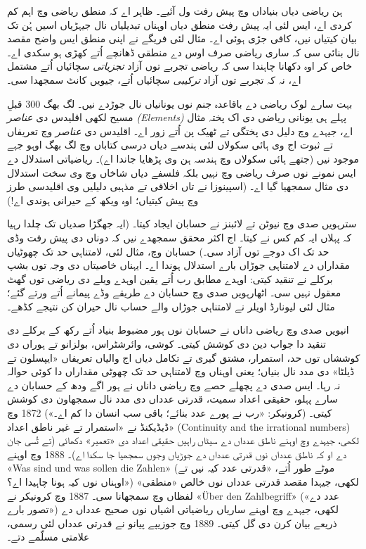 \documentclass[../../../include/open-logic-section]{subfiles}
\begin{document}
ہن ریاضی دیاں بنیاداں وچ پیش رفت ول آئیے۔
ظاہر اے کہ منطق ریاضی وچ اہم کم کردی اے، ایس لئی
ایہ پیش رفت منطق دیاں اوہناں تبدیلیاں نال
جیہڑیاں اسیں ہُن تک بیان کیتیاں نیں،
کافی جڑی ہوئی اے۔ مثال لئی فریگے نے اپنی
منطق ایس واضح مقصد نال بنائی سی کہ ساری
ریاضی صرف اوس دے منطقی ڈھانچے اُتے کھڑی
ہو سکدی اے۔ خاص کر اوہ دکھانا چاہندا سی
کہ ریاضی تجربے توں آزاد \emph{تجزیاتی}
سچائیاں اُتے مشتمل اے، نہ کہ تجربے توں
آزاد \emph{ترکیبی} سچائیاں اُتے، جیویں
کانٹ سمجھدا سی۔

بہت سارے لوک ریاضی دے باقاعدہ جنم نوں یونانیاں نال
جوڑدے نیں۔ لگ بھگ 300 قبلِ مسیح لکھی اقلیدس دی
\emph{عناصر (Elements)} پہلے ہی یونانی ریاضی دی
اک پختہ مثال اے، جیہدے وچ دلیل دی پختگی تے ٹھیک پن اُتے
زور اے۔ اقلیدس دی \emph{عناصر} وچ تعریفاں تے
ثبوت اج وی ہائی سکولاں لئی ہندسے دیاں درسی کتاباں وچ لگ بھگ
اوہو جہے موجود نیں (جتھے ہائی سکولاں وچ ہندسہ ہن وی
پڑھایا جاندا اے)۔ ریاضیاتی استدلال دے ایس نمونے
نوں صرف ریاضی وچ نہیں بلکہ فلسفے دیاں شاخاں وچ وی
سخت استدلال دی مثال سمجھیا گیا اے۔ (اسپینوزا نے
تاں اخلاقی تے مذہبی دلیلیں وی اقلیدسی طرز وچ پیش
کیتیاں؛ اوہ ویکھ کے حیرانی ہوندی اے!)

سترہویں صدی وچ نیوٹن تے لائبنز نے حسابان ایجاد کیتا۔
(ایہ جھگڑا صدیاں تک چلدا رہیا کہ پہلاں ایہ کم کس نے کیتا۔ اج
اکثر محقق سمجھدے نیں کہ دوناں دی پیش رفت وڈی حد
تک اک دوجے توں آزاد سی۔) حسابان وچ، مثال لئی،
لامتناہی حد تک چھوٹیاں مقداراں دے لامتناہی جوڑاں بارے
استدلال ہوندا اے۔ ایہناں خاصیتاں دی وجہ توں
بشپ برکلے نے تنقید کیتی: اوہدے مطابق رب اُتے
یقین اوہدے ویلے دی ریاضی توں گھٹ معقول نہیں سی۔
اٹھارہویں صدی وچ حسابان دے طریقے وڈے پیمانے
اُتے ورتے گئے؛ مثال لئی لیونارڈ اویلر نے
لامتناہی جوڑاں والے حساب نال حیران کن
نتیجے کڈھے۔

انیویں صدی وچ ریاضی داناں نے حسابان نوں ہور مضبوط
بنیاد اُتے رکھ کے برکلے دی تنقید دا جواب دین دی
کوشش کیتی۔ کوشی، وائرشٹراس، بولزانو تے ہوراں دی
کوششاں توں حد، استمرار، مشتق گیری تے تکامل دیاں
اج والیاں تعریفاں «ایپسلون تے ڈیلٹا» دی مدد نال
بنیاں؛ یعنی اوہناں وچ لامتناہی حد تک چھوٹی
مقداراں دا کوئی حوالہ نہ رہا۔ ایس صدی دے پچھلے
حصے وچ ریاضی داناں نے ہور اگے ودھ کے حسابان
دے سارے پہلو، حقیقی اعداد سمیت، قدرتی عدداں
دی مدد نال سمجھاون دی کوشش کیتی۔ (کرونیکر:
«رب نے پورے عدد بنائے؛ باقی سب انسان دا کم اے۔»)
1872 وچ ڈیڈیکنڈ نے «استمرار تے غیر ناطق اعداد»
(Continuity and the irrational numbers) لکھی،
جیہدے وچ اوہنے ناطق عدداں دے سیٹاں راہیں
حقیقی اعداد دی «تعمیر» دکھائی (تے تُسی جان دے
او کہ ناطق عدداں نوں قدرتی عدداں دے جوڑیاں
وجوں سمجھیا جا سکدا اے)۔ 1888 وچ اوہنے
«Was sind und was sollen die Zahlen» (موٹے
طور اُتے، «قدرتی عدد کیہ نیں تے اوہناں نوں
کیہ ہونا چاہیدا اے؟») لکھی، جیہدا مقصد
قدرتی عدداں نوں خالص «منطقی» لفظاں وچ
سمجھانا سی۔ 1887 وچ کرونیکر نے
«\"Uber den Zahlbegriff» («عدد دے تصور بارے»)
لکھی، جیہدے وچ اوہنے ساریاں ریاضیاتی
اشیاں نوں صحیح عدداں دے ذریعے بیان کرن
دی گل کیتی۔ 1889 وچ جوزیپے پیانو نے
قدرتی عدداں لئی رسمی، علامتی مسلّمے دتے۔
\end{document}
